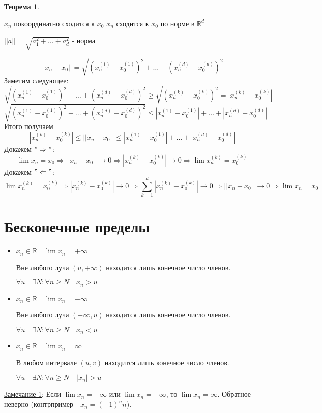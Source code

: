 \documentclass[12pt,letterpaper]{report}
\makeatletter
\newtheorem{theorem}{Теорема}
\renewenvironment{proof}[1][\proofname]{%
   \par\pushQED{\qed}\normalfont%
   \topsep6\p@\@plus6\p@\relax
   \trivlist\item[\hskip\labelsep\bfseries#1\@addpunct{.}]%
   \ignorespaces
}{%
   \popQED\endtrivlist\@endpefalse
}
\makeatother
\begin{document}
\begin{theorem} \end{theorem}
$x_n$ покоординатно сходится к $x_0$ \Longleftrightarrow $x_n$ сходится к $x_0$ по норме в $\mathbb{R}^d$ 

$||a|| = \sqrt{a_1^2 + \dots + a_d^2}$ - норма

\begin{proof}
    \[ ||x_n - x_0|| = \sqrt{(x_n^{(1)} - x_0^{(1)})^2 + \dots + (x_n^{(d)} - x_0^{(d)})^2} \]
    Заметим следующее: 
    \[ \sqrt{(x_n^{(1)} - x_0^{(1)})^2 + \dots + (x_n^{(d)} - x_0^{(d)})^2} \geqslant \sqrt{(x_n^{(k)} - x_0^{(k)})^2} = |x_n^{(k)} - x_0^{(k)}| \]
    \[  \sqrt{(x_n^{(1)} - x_0^{(1)})^2 + \dots + (x_n^{(d)} - x_0^{(d)})^2} \leqslant |x_n^{(1)} - x_0^{(1)}| + \dots + |x_n^{(d)} - x_0^{(d)}| \]
    Итого получаем
    \[ |x_n^{(k)} - x_0^{(k)}| \leqslant ||x_n - x_0|| \leqslant |x_n^{(1)} - x_0^{(1)}| + \dots + |x_n^{(d)} - x_0^{(d)}| \]
    Докажем $"\Rightarrow"$:
    \[ \lim x_n = x_0 \Rightarrow ||x_n - x_0|| \to 0 \Rightarrow  |x_n^{(k)} - x_0^{(k)}| \to 0 \Rightarrow \lim x_n^{(k)} = x_0^{(k)} \]
    Докажем $"\Leftarrow"$:
    \[ \lim x_n^{(k)} = x_0^{(k)} \Rightarrow |x_n^{(k)} - x_0^{(k)}| \to 0 \Rightarrow \sum_{k = 1}^d |x_n^{(k)} - x_0^{(k)}| \to 0 \Rightarrow ||x_n - x_0|| \to 0 \Rightarrow \lim x_n = x_0  \]
\end{proof}

\section{Бесконечные пределы}
\begin{itemize}
    \item \underline{$x_n \in \mathbb{R} \quad \lim x_n = +\infty$}
    
    Вне любого луча $(u, +\infty)$ находится лишь конечное число членов.
    
    $\forall u\quad \exists N: \forall n \geqslant N \quad x_n > u$
    \item \underline{$x_n \in \mathbb{R} \quad \lim x_n = -\infty$}
    
    Вне любого луча $(-\infty, u)$ находится лишь конечное число членов.
    
    $\forall u\quad \exists N: \forall n \geqslant N \quad x_n < u$
    
    \item \underline{$x_n \in \mathbb{R} \quad \lim x_n = \infty$}
    
    В любом интервале $(u, v)$ находится лишь конечное число членов.
    
    $\forall u\quad \exists N: \forall n \geqslant N \quad |x_n| > u$
\end{itemize} 
\vspace{0.7cm}
\underline{Замечание 1}: Если $\lim x_n = +\infty$ или $\lim x_n = -\infty$, то $\lim x_n = \infty$. Обратное неверно (контрпример - $x_n = (-1)^nn$).
\end{document}
